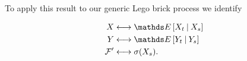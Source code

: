 To apply this result to our generic Lego brick process we identify

\begin{align}
\begin{split}
X &\longleftrightarrow \bE\left[X_t \: \lvert \: X_s \right] \\
Y &\longleftrightarrow \bE\left[Y_t \: \lvert \: Y_s \right] \\ 
\mathcal{F}^\prime &\longleftrightarrow \sigma(X_s).
\end{split}
\end{align}
